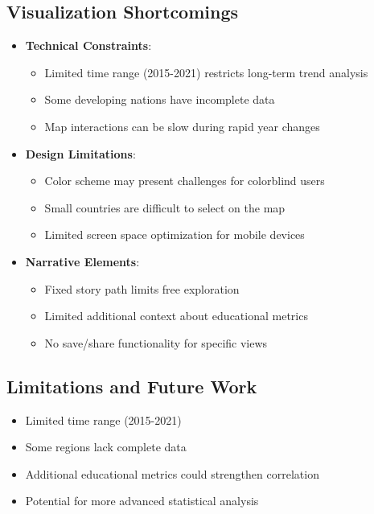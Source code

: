 \documentclass{article}
\begin{document}
\subsection{Visualization Shortcomings}
\begin{itemize}
    \item \textbf{Technical Constraints}:
        \begin{itemize}
            \item Limited time range (2015-2021) restricts long-term trend analysis
            \item Some developing nations have incomplete data
            \item Map interactions can be slow during rapid year changes
        \end{itemize}
    \item \textbf{Design Limitations}:
        \begin{itemize}
            \item Color scheme may present challenges for colorblind users
            \item Small countries are difficult to select on the map
            \item Limited screen space optimization for mobile devices
        \end{itemize}
    \item \textbf{Narrative Elements}:
        \begin{itemize}
            \item Fixed story path limits free exploration
            \item Limited additional context about educational metrics
            \item No save/share functionality for specific views
        \end{itemize}
\end{itemize}

\subsection{Limitations and Future Work}
\begin{itemize}
    \item Limited time range (2015-2021)
    \item Some regions lack complete data
    \item Additional educational metrics could strengthen correlation
    \item Potential for more advanced statistical analysis
\end{itemize}
\end{document}
